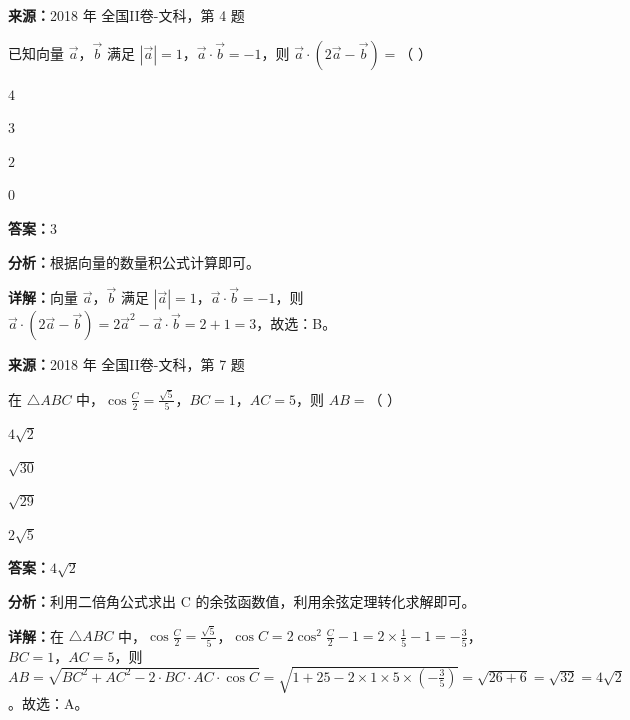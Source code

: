 \begin{question}[points=5]
\textbf{来源：}2018 年 全国II卷-文科，第 4 题\par
已知向量 $\vec{a}$，$\vec{b}$ 满足 $|\vec{a}|=1$，$\vec{a}\cdot\vec{b}=-1$，则 $\vec{a}\cdot(2\vec{a}-\vec{b})=$（ ）
\begin{choices}
  \item $4$
  \item $3$
  \item $2$
  \item $0$
\end{choices}
\begin{solution}
\textbf{答案：}$3$

\textbf{分析：}根据向量的数量积公式计算即可。

\textbf{详解：}向量 $\vec{a}$，$\vec{b}$ 满足 $|\vec{a}|=1$，$\vec{a}\cdot\vec{b}=-1$，则 $\vec{a}\cdot(2\vec{a}-\vec{b})=2\vec{a}^2-\vec{a}\cdot\vec{b}=2+1=3$，故选：B。
\end{solution}
\end{question}

\begin{question}[points=5]
\textbf{来源：}2018 年 全国II卷-文科，第 7 题\par
在 $\triangle ABC$ 中，$\cos\frac{C}{2}=\frac{\sqrt{5}}{5}$，$BC=1$，$AC=5$，则 $AB=$（ ）
\begin{choices}
  \item $4\sqrt{2}$
  \item $\sqrt{30}$
  \item $\sqrt{29}$
  \item $2\sqrt{5}$
\end{choices}
\begin{solution}
\textbf{答案：}$4\sqrt{2}$

\textbf{分析：}利用二倍角公式求出 C 的余弦函数值，利用余弦定理转化求解即可。

\textbf{详解：}在 $\triangle ABC$ 中，$\cos\frac{C}{2}=\frac{\sqrt{5}}{5}$，$\cos C=2\cos^2\frac{C}{2}-1=2\times\frac{1}{5}-1=-\frac{3}{5}$，$BC=1$，$AC=5$，则 $AB=\sqrt{BC^2+AC^2-2\cdot BC\cdot AC\cdot\cos C}=\sqrt{1+25-2\times1\times5\times(-\frac{3}{5})}=\sqrt{26+6}=\sqrt{32}=4\sqrt{2}$。故选：A。
\end{solution}
\end{question}

